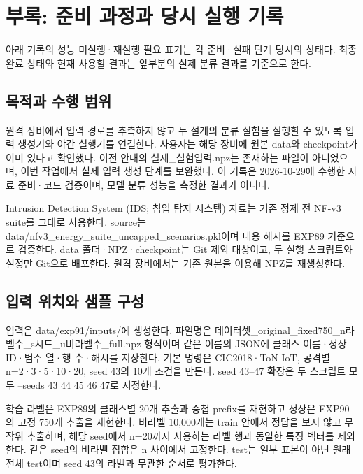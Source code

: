 
\clearpage
\section*{부록: 준비 과정과 당시 실행 기록}
아래 기록의 성능 미실행·재실행 필요 표기는 각 준비·실패 단계 당시의 상태다.
최종 완료 상태와 현재 사용할 결과는 앞부분의 실제 분류 결과를 기준으로 한다.
\subsection{목적과 수행 범위}
원격 장비에서 입력 경로를 추측하지 않고 두 설계의 분류 실험을 실행할 수 있도록 입력 생성기와 야간 실행기를 연결한다. 사용자는 해당 장비에 원본 data와 checkpoint가 이미 있다고 확인했다. 이전 안내의 실제\_\allowbreak{}실험입력.npz는 존재하는 파일이 아니었으며, 이번 작업에서 실제 입력 생성 단계를 보완했다. 이 기록은 2026-10-29에 수행한 자료 준비·코드 검증이며, 모델 분류 성능을 측정한 결과가 아니다.

Intrusion Detection System (IDS; 침입 탐지 시스템) 자료는 기존 정제 전 NF-v3 suite를 그대로 사용한다. source는 data/\allowbreak{}nfv3\_\allowbreak{}energy\_\allowbreak{}suite\_\allowbreak{}uncapped\_\allowbreak{}scenarios.pkl이며 내용 해시를 EXP89 기준으로 검증한다. data 폴더·NPZ·checkpoint는 Git 제외 대상이고, 두 실행 스크립트와 설정만 Git으로 배포한다. 원격 장비에서는 기존 원본을 이용해 NPZ를 재생성한다.

\subsection{입력 위치와 샘플 구성}
입력은 data/\allowbreak{}exp91/\allowbreak{}inputs/\allowbreak{}에 생성한다. 파일명은 데이터셋\_\allowbreak{}original\_\allowbreak{}fixed750\_\allowbreak{}n라벨수\_\allowbreak{}s시드\_\allowbreak{}u비라벨수\_\allowbreak{}full.npz 형식이며 같은 이름의 JSON에 클래스 이름·정상 ID·범주 열·행 수·해시를 저장한다. 기본 명령은 CIC2018·ToN-IoT, 공격별 n=\allowbreak{}2·3·5·10·20, seed 43의 10개 조건을 만든다. seed 43--47 확장은 두 스크립트 모두 --seeds 43 44 45 46 47로 지정한다.

학습 라벨은 EXP89의 클래스별 20개 추출과 중첩 prefix를 재현하고 정상은 EXP90의 고정 750개 추출을 재현한다. 비라벨 10,000개는 train 안에서 정답을 보지 않고 무작위 추출하며, 해당 seed에서 n=\allowbreak{}20까지 사용하는 라벨 행과 동일한 특징 벡터를 제외한다. 같은 seed의 비라벨 집합은 n 사이에서 고정한다. test는 일부 표본이 아닌 원래 전체 test이며 seed 43의 라벨과 무관한 순서로 평가한다.

